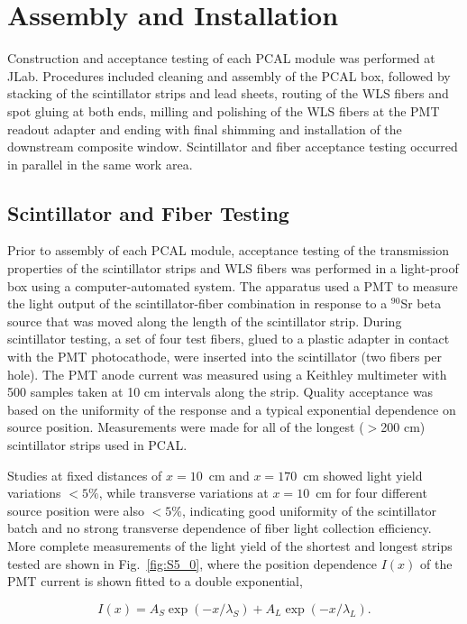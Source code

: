 \section{Assembly and Installation}
Construction and acceptance testing of each PCAL module was performed at JLab.  Procedures included cleaning and assembly of the PCAL box, followed by stacking of the scintillator strips and lead sheets, routing of the WLS fibers and spot gluing at both ends, milling and polishing of the WLS fibers at the PMT readout adapter and ending with final shimming and installation of the downstream composite window.  Scintillator and fiber acceptance testing occurred in parallel in the same work area.


\subsection{Scintillator and Fiber Testing}
Prior to assembly of each PCAL module, acceptance testing of the transmission properties of the scintillator strips and WLS fibers was performed in a light-proof box using a computer-automated system.  The apparatus used a PMT to measure the light output of the scintillator-fiber combination in response to a $^{90}$Sr beta source that was moved along the length of the scintillator strip. During scintillator testing, a set of four test fibers, glued to a plastic adapter in contact with the PMT photocathode, were inserted into the scintillator (two fibers per hole).  The PMT anode current was measured using a Keithley multimeter with 500 samples taken at 10 cm intervals along the strip.  Quality acceptance was based on the uniformity of the response and a typical exponential dependence on source position. Measurements were made for all of the longest ($>$200 cm) scintillator strips used in PCAL.

Studies at fixed distances of $x=10$~cm and $x=170$~cm showed light yield variations $<5\%$, while transverse variations at $x=10$~cm for four different source position were also $<5\%$, indicating good uniformity of the scintillator batch and no strong transverse dependence of fiber light collection efficiency.  More complete measurements of the light yield of the shortest and longest strips tested are shown in Fig.~\ref{fig:S5_0}, where the position dependence $I(x)$ of the PMT current is shown fitted to a double exponential,

\begin{equation}
I(x) = A_S \exp(-x/\lambda_S)+A_L \exp(-x/\lambda_L).
\end{equation}

